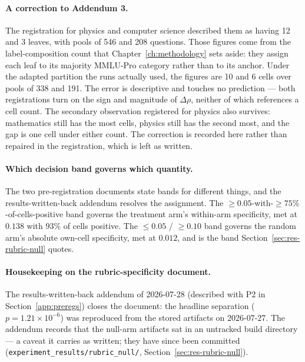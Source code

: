 \paragraph{A correction to Addendum 3.} The registration for physics
and computer science described them as having 12 and 3 leaves, with
pools of 546 and 208 questions. Those figures come from the
label-composition count that Chapter~\ref{ch:methodology} sets aside:
they assign each leaf to its majority MMLU-Pro category rather than to
its anchor. Under the adapted partition the runs actually used, the
figures are 10 and 6 cells over pools of 338 and 191. The error is
descriptive and touches no prediction --- both registrations turn on
the sign and magnitude of $\Delta\rho$, neither of which references a
cell count. The secondary observation registered for physics also
survives: mathematics still has the most cells, physics still has the
second most, and the gap is one cell under either count. The
correction is recorded here rather than repaired in the registration,
which is left as written.

\paragraph{Which decision band governs which quantity.} The two
pre-registration documents state bands for different things, and the
results-written-back addendum resolves the assignment. The
$\geq 0.05$-with-$\geq 75\%$-of-cells-positive band governs the
treatment arm's within-arm specificity, met at $0.138$ with $93\%$ of
cells positive. The $\leq 0.05$ / $\geq 0.10$ band governs the random
arm's absolute own-cell specificity, met at $0.012$, and is the band
Section~\ref{sec:res-rubric-null} quotes.

\paragraph{Housekeeping on the rubric-specificity document.} The
results-written-back addendum of 2026-07-28 (described with P2 in
Section~\ref{app:preregs}) closes the document: the headline
separation ($p = 1.21 \times 10^{-6}$) was reproduced from the stored
artifacts on 2026-07-27. The addendum records that the null-arm
artifacts sat in an untracked build directory --- a caveat it carries
as written; they have since been committed
(\texttt{experiment\_results/rubric\_null/},
Section~\ref{sec:res-rubric-null}).
